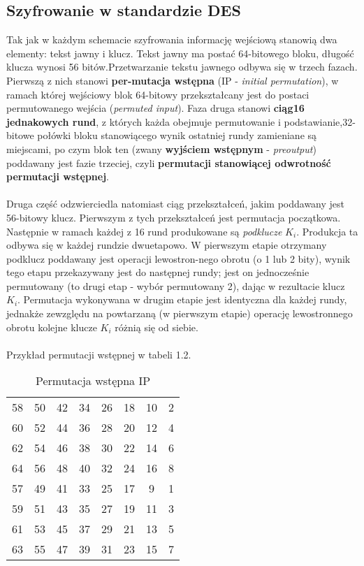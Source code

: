 \documentclass[12pt, letterpaper, titlepage]{article}
\begin{document}
\subsection{Szyfrowanie w standardzie DES}
Tak jak w każdym schemacie szyfrowania informację wejściową stanowią dwa elementy: tekst jawny i klucz. Tekst jawny ma postać 64-bitowego bloku, długość klucza wynosi 56 bitów.Przetwarzanie tekstu jawnego odbywa się w trzech fazach. Pierwszą z nich stanowi \textbf{per-mutacja wstępna} (IP - \textit{initial  permutation}), w ramach której wejściowy blok 64-bitowy przekształcany jest do postaci permutowanego wejścia (\textit{permuted  input}). Faza druga stanowi \textbf{ciąg16 jednakowych rund}, z których każda obejmuje permutowanie i podstawianie,32-bitowe połówki bloku stanowiącego wynik ostatniej rundy zamieniane są miejscami, po czym blok ten (zwany \textbf{wyjściem wstępnym} - \textit{preoutput}) poddawany jest fazie trzeciej, czyli \textbf{permutacji stanowiącej odwrotność permutacji wstępnej}. \\ \\ Druga część odzwierciedla natomiast ciąg przekształceń, jakim poddawany jest 56-bitowy klucz. Pierwszym z tych przekształceń jest permutacja początkowa. Następnie w ramach każdej z 16 rund produkowane są \textit{podklucze} $K_i$. Produkcja ta odbywa się w każdej rundzie dwuetapowo. W pierwszym etapie otrzymany podklucz poddawany jest operacji lewostron-nego obrotu (o 1 lub 2 bity), wynik tego etapu przekazywany jest do następnej rundy; jest on jednocześnie permutowany (to drugi etap - wybór permutowany 2), dając w rezultacie klucz $K_i$. Permutacja wykonywana w drugim etapie jest identyczna dla każdej rundy, jednakże zewzględu na powtarzaną (w pierwszym etapie) operację lewostronnego obrotu kolejne klucze $K_i$ różnią się od siebie.\\ \\
Przykład permutacji wstępnej w tabeli 1.2. \\
\begin{table}[h]
\centering\caption{Permutacja wstępna IP}
\begin{tabular}{|c c c c c c c c|}
\hline
58 & 50 & 42 & 34 & 26 & 18 & 10 & 2 \\

60 & 52 & 44 & 36 & 28 & 20 & 12 & 4\\

62 & 54 & 46 & 38 & 30 & 22 & 14  & 6\\

64 & 56 & 48 & 40 & 32 & 24 & 16  & 8\\

57 & 49 & 41 & 33 & 25 & 17 & 9   &  1 \\

59 & 51 & 43 & 35 & 27 & 19 & 11  &   3\\

61 & 53 & 45 & 37 & 29 & 21 & 13  &   5\\

63 & 55 & 47 & 39 & 31 & 23 & 15  &   7\\
\hline
\end{tabular}
\end{table}
\end{document}
